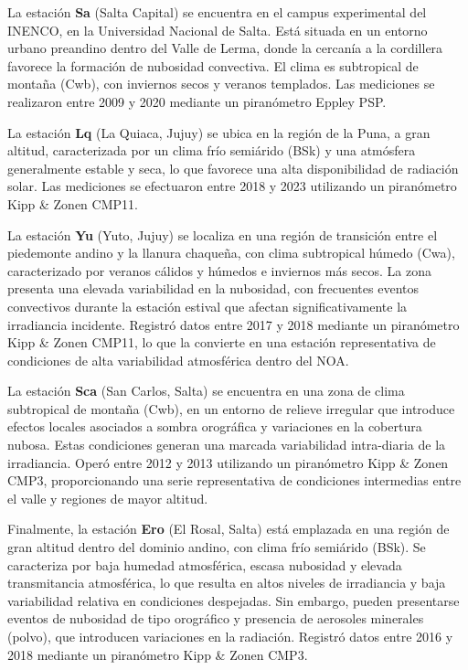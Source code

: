 La estación \textbf{Sa} (Salta Capital) se encuentra en el campus experimental del INENCO, en la Universidad Nacional de Salta. Está situada en un entorno urbano preandino dentro del Valle de Lerma, donde la cercanía a la cordillera favorece la formación de nubosidad convectiva. El clima es subtropical de montaña (Cwb), con inviernos secos y veranos templados. Las mediciones se realizaron entre 2009 y 2020 mediante un piranómetro Eppley PSP.

La estación \textbf{Lq} (La Quiaca, Jujuy) se ubica en la región de la Puna, a gran altitud, caracterizada por un clima frío semiárido (BSk) y una atmósfera generalmente estable y seca, lo que favorece una alta disponibilidad de radiación solar. Las mediciones se efectuaron entre 2018 y 2023 utilizando un piranómetro Kipp \& Zonen CMP11.

La estación \textbf{Yu} (Yuto, Jujuy) se localiza en una región de transición entre el piedemonte andino y la llanura chaqueña, con clima subtropical húmedo (Cwa), caracterizado por veranos cálidos y húmedos e inviernos más secos. La zona presenta una elevada variabilidad en la nubosidad, con frecuentes eventos convectivos durante la estación estival que afectan significativamente la irradiancia incidente. Registró datos entre 2017 y 2018 mediante un piranómetro Kipp \& Zonen CMP11, lo que la convierte en una estación representativa de condiciones de alta variabilidad atmosférica dentro del NOA.

La estación \textbf{Sca} (San Carlos, Salta) se encuentra en una zona de clima subtropical de montaña (Cwb), en un entorno de relieve irregular que introduce efectos locales asociados a sombra orográfica y variaciones en la cobertura nubosa. Estas condiciones generan una marcada variabilidad intra-diaria de la irradiancia. Operó entre 2012 y 2013 utilizando un piranómetro Kipp \& Zonen CMP3, proporcionando una serie representativa de condiciones intermedias entre el valle y regiones de mayor altitud.

Finalmente, la estación \textbf{Ero} (El Rosal, Salta) está emplazada en una región de gran altitud dentro del dominio andino, con clima frío semiárido (BSk). Se caracteriza por baja humedad atmosférica, escasa nubosidad y elevada transmitancia atmosférica, lo que resulta en altos niveles de irradiancia y baja variabilidad relativa en condiciones despejadas. Sin embargo, pueden presentarse eventos de nubosidad de tipo orográfico y presencia de aerosoles minerales (polvo), que introducen variaciones en la radiación. Registró datos entre 2016 y 2018 mediante un piranómetro Kipp \& Zonen CMP3.


